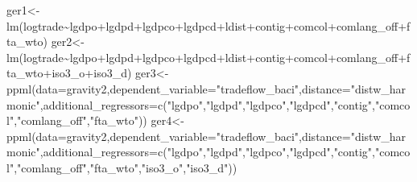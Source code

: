 \documentclass[
  a4paper,
  DIV=11,
  numbers=noendperiod]{scrreprt}
\newenvironment{Shaded}{\begin{snugshade}}{\end{snugshade}}
\newcommand{\AttributeTok}[1]{\textcolor[rgb]{0.40,0.45,0.13}{#1}}
\newcommand{\FunctionTok}[1]{\textcolor[rgb]{0.28,0.35,0.67}{#1}}
\newcommand{\NormalTok}[1]{\textcolor[rgb]{0.00,0.23,0.31}{#1}}
\newcommand{\OtherTok}[1]{\textcolor[rgb]{0.00,0.23,0.31}{#1}}
\newcommand{\SpecialCharTok}[1]{\textcolor[rgb]{0.37,0.37,0.37}{#1}}
\newcommand{\StringTok}[1]{\textcolor[rgb]{0.13,0.47,0.30}{#1}}
\begin{document}
\begin{Shaded}
\begin{Highlighting}[]
\NormalTok{ger1}\OtherTok{\textless{}{-}}\FunctionTok{lm}\NormalTok{(logtrade}\SpecialCharTok{\textasciitilde{}}\NormalTok{lgdpo}\SpecialCharTok{+}\NormalTok{lgdpd}\SpecialCharTok{+}\NormalTok{lgdpco}\SpecialCharTok{+}\NormalTok{lgdpcd}\SpecialCharTok{+}\NormalTok{ldist}\SpecialCharTok{+}\NormalTok{contig}\SpecialCharTok{+}\NormalTok{comcol}\SpecialCharTok{+}\NormalTok{comlang\_off}\SpecialCharTok{+}\NormalTok{fta\_wto)}
\NormalTok{ger2}\OtherTok{\textless{}{-}}\FunctionTok{lm}\NormalTok{(logtrade}\SpecialCharTok{\textasciitilde{}}\NormalTok{lgdpo}\SpecialCharTok{+}\NormalTok{lgdpd}\SpecialCharTok{+}\NormalTok{lgdpco}\SpecialCharTok{+}\NormalTok{lgdpcd}\SpecialCharTok{+}\NormalTok{ldist}\SpecialCharTok{+}\NormalTok{contig}\SpecialCharTok{+}\NormalTok{comcol}\SpecialCharTok{+}\NormalTok{comlang\_off}\SpecialCharTok{+}\NormalTok{fta\_wto}\SpecialCharTok{+}\NormalTok{iso3\_o}\SpecialCharTok{+}\NormalTok{iso3\_d)}
\NormalTok{ger3}\OtherTok{\textless{}{-}}\FunctionTok{ppml}\NormalTok{(}\AttributeTok{data=}\NormalTok{gravity2,}\AttributeTok{dependent\_variable=}\StringTok{"tradeflow\_baci"}\NormalTok{,}\AttributeTok{distance=}\StringTok{"distw\_harmonic"}\NormalTok{,}\AttributeTok{additional\_regressors=}\FunctionTok{c}\NormalTok{(}\StringTok{"lgdpo"}\NormalTok{,}\StringTok{"lgdpd"}\NormalTok{,}\StringTok{"lgdpco"}\NormalTok{,}\StringTok{"lgdpcd"}\NormalTok{,}\StringTok{"contig"}\NormalTok{,}\StringTok{"comcol"}\NormalTok{,}\StringTok{"comlang\_off"}\NormalTok{,}\StringTok{"fta\_wto"}\NormalTok{))}
\NormalTok{ger4}\OtherTok{\textless{}{-}}\FunctionTok{ppml}\NormalTok{(}\AttributeTok{data=}\NormalTok{gravity2,}\AttributeTok{dependent\_variable=}\StringTok{"tradeflow\_baci"}\NormalTok{,}\AttributeTok{distance=}\StringTok{"distw\_harmonic"}\NormalTok{,}\AttributeTok{additional\_regressors=}\FunctionTok{c}\NormalTok{(}\StringTok{"lgdpo"}\NormalTok{,}\StringTok{"lgdpd"}\NormalTok{,}\StringTok{"lgdpco"}\NormalTok{,}\StringTok{"lgdpcd"}\NormalTok{,}\StringTok{"contig"}\NormalTok{,}\StringTok{"comcol"}\NormalTok{,}\StringTok{"comlang\_off"}\NormalTok{,}\StringTok{"fta\_wto"}\NormalTok{,}\StringTok{"iso3\_o"}\NormalTok{,}\StringTok{"iso3\_d"}\NormalTok{))}
\end{Highlighting}
\end{Shaded}
\end{document}
